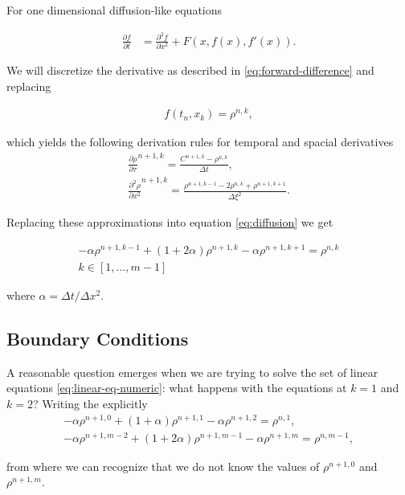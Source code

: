For one dimensional diffusion-like equations

\begin{align}
\frac{\partial f}{\partial t} &= \frac{\partial^2 f}{\partial x^2} + F(x, f(x), f'(x)).
\label{eq:finite-difference}
\end{align}

We will discretize the derivative as described in \ref{eq:forward-difference} and replacing 

\begin{align}
	f(t_n, x_k) = \rho^{n,k},
\end{align}

which yields the following derivation rules for temporal and spacial derivatives
\begin{align}
\frac{\partial \rho}{\partial \tau}^{n+1, k}= \frac{C^{n+1, k}-\rho^{n, k}}{\Delta t},\\
\frac{\partial^2 \rho}{\partial x^2}^{n+1, k} = \frac{\rho^{n+1, k-1}-2\rho^{n, k}+\rho^{n+1, k+1}}{\Delta \xi^2}.
\end{align}

Replacing these approximations into equation \ref{eq:diffusion} we get

\begin{align}	
\label{eq:linear-eq-numeric}
    -\alpha \rho^{n+1,k-1} + ( 1 + 2\alpha ) \rho^{n+1,k} -\alpha \rho^{n+1,k+1} =  \rho^{n,k}\\
    k \in [1, ... , m-1]
    \label{eq:equations-n}
\end{align}

where $\alpha = \Delta t / \Delta x^2$.

\subsection{Boundary Conditions}

A reasonable question emerges when we are trying to solve the set of linear equations \ref{eq:linear-eq-numeric}: what happens with the equations at $k=1$ and $k=2$? Writing the explicitly
\begin{align}
    -\alpha \rho^{n+1,0} + ( 1 + \alpha ) \rho^{n+1,1} -\alpha \rho^{n+1,2} = \rho^{n,1},\\
    -\alpha \rho^{n+1,m-2} + ( 1 + 2\alpha ) \rho^{n+1,m-1} -\alpha \rho^{n+1,m} = \rho^{n,m-1},
    \label{eq:border-equations}
\end{align}

from where we can recognize that we do not know the values of $\rho^{n+1,0}$ and $\rho^{n+1,m}$.

